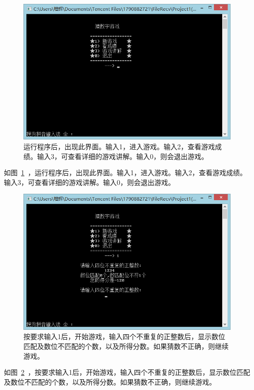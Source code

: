 \begin{figure}[htp]
\includegraphics[width=\textwidth]{image/21.png}
\caption{\label{p1}运行程序后，出现此界面。输入1，进入游戏。输入2，查看游戏成绩。输入3，可查看详细的游戏讲解。输入0，则会退出游戏。}
\end{figure}

如图~\ref{p1}~，运行程序后，出现此界面。输入1，进入游戏。输入2，查看游戏成绩。输入3，可查看详细的游戏讲解。输入0，则会退出游戏。

\begin{figure}[htp]
\includegraphics[width=\textwidth]{image/22.png}
\caption{\label{p2}按要求输入1后，开始游戏，输入四个不重复的正整数后，显示数位匹配及数位不匹配的个数，以及所得分数。如果猜数不正确，则继续游戏。}
\end{figure}

如图~\ref{p2}~，按要求输入1后，开始游戏，输入四个不重复的正整数后，显示数位匹配及数位不匹配的个数，以及所得分数。如果猜数不正确，则继续游戏。


